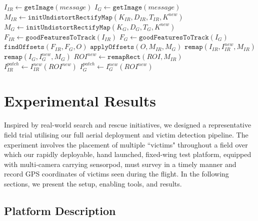 \documentclass[runningheads]{llncs}
\begin{document}
\begin{algorithm}
\begin{algorithmic}[1]
\State $I_{IR} \gets \texttt{getImage}(message)$
\EndIf
{}
\State $I_{G} \gets \texttt{getImage}(message)$
\State $M_{IR} \gets \texttt{initUndistortRectifyMap}(K_{IR}, D_{IR}, T_{IR}, K^{new})$
\State $M_{G} \gets \texttt{initUndistortRectifyMap}(K_{G}, D_{G}, T_{G}, K^{new})$
\EndIf
{}
\State $F_{IR} \gets \texttt{goodFeaturesToTrack}(I_{IR})$
\State $F_{G} \gets \texttt{goodFeaturesToTrack}(I_{G})$
\State $\texttt{findOffsets}(F_{IR}, F_{G}, O)$
\State $\texttt{applyOffsets}(O, M_{IR}, M_{G})$    
\State $\texttt{remap}(I_{IR}, I_{IR}^{new}, M_{IR})$
\State $\texttt{remap}(I_{G}, I_{G}^{new}, M_{G})$
\EndIf
{}
\State $ROI^{new} \gets \texttt{remapRect}(ROI, M_{IR})$
\State $I_{IR}^{patch} \gets I_{IR}^{new}(ROI^{new})$
\State $I_{G}^{patch} \gets I_{G}^{new}(ROI^{new})$
\EndWhile
\EndProcedure
\end{algorithmic}
\end{algorithm}


\section{Experimental Results}

Inspired by real-world search and rescue initiatives, we designed a representative field trial utilising our full aerial deployment and victim detection pipeline. The experiment involves the placement of multiple ``victims" throughout a field over which our rapidly deployable, hand launched, fixed-wing test platform, equipped with multi-camera carrying sensorpod, must survey in a timely manner and record GPS coordinates of victims seen during the flight. In the following sections, we present the setup, enabling tools, and results.

\subsection{Platform Description}
\end{document}
